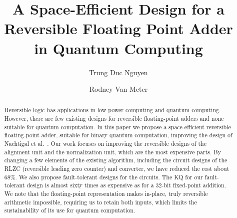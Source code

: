 \documentclass[%
reprint,
 amsmath,amssymb,
 aps,
]{revtex4-1}
\begin{document}
\title{A Space-Efficient Design for a Reversible Floating Point Adder\\ in Quantum Computing} %



\author{ Trung Duc Nguyen
}
\author{ Rodney Van Meter
}


\begin{abstract}
Reversible logic has applications in low-power computing and quantum computing. However, there are few existing designs for reversible floating-point adders and none suitable for quantum computation. In this paper we propose a space-efficient reversible floating-point adder, suitable for binary quantum computation, improving the design of Nachtigal et al.~\cite{nachtigal}. Our work focuses on improving the reversible designs of the alignment unit and the normalization unit, which are the most expensive parts. By changing a few elements of the existing algorithm, including the circuit designs of the RLZC (reversible leading zero counter) and converter, we have reduced the cost about 68\%. We also propose fault-tolerant designs for the circuits. The KQ for our fault-tolerant design is almost sixty times as expensive as for a 32-bit fixed-point addition. We note that the floating-point representation makes in-place, truly reversible arithmetic impossible, requiring us to retain both inputs, which limits the sustainability of its use for quantum computation.  

\end{abstract}
\end{document}
